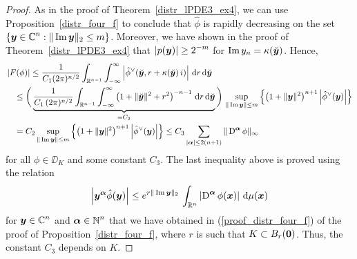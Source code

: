 \begin{proof}
As in the proof of Theorem~\ref{distr_lPDE3_ex4}, we can use
Proposition~\ref{distr_four_f} to conclude that $\hat{\phi}$ is
rapidly decreasing on the set
$\displaystyle \{{\bm{y}} \in \mathbb{C}^n : \|\operatorname{Im} {\bm{y}}\|_2 \leq m \}$.
Moreover, we have shown in the proof of Theorem~\ref{distr_lPDE3_ex4} that
$\displaystyle \left|p({\bm{y}})\right| \geq 2^{-m}$ for
$\operatorname{Im} y_n = \kappa(\breve{{\bm{y}}})$.  Hence, 
\begin{align*}
&\left| F(\phi) \right|
\leq \frac{1}{C_1(2\pi)^{n/2}}
\int_{\mathbb{R}^{n-1}} \int_{-\infty}^\infty
\left| \hat{\phi}^\vee(\breve{{\bm{y}}},r + \kappa(\breve{{\bm{y}}})\,i) \right|
\,\mathrm{d}{r}\,\mathrm{d}{\breve{{\bm{y}}}} \\
&\quad\leq \bigg( \underbrace{ \frac{1}{C_1\,(2\pi)^{n/2}}
\int_{\mathbb{R}^{n-1}} \int_{-\infty}^\infty
\left( 1+\|\breve{{\bm{y}}}\|^2 + r^2\right)^{-n-1} \,\mathrm{d}{r}
  \,\mathrm{d}{\breve{{\bm{y}}}}}_{=C_2} \bigg)
\, \sup_{\|\operatorname{Im} {\bm{y}}\| \leq m } \left\{
\left( 1+ \|{\bm{y}}\|^2  \right)^{n+1}
\left| \hat{\phi}^\vee({\bm{y}}) \right| \right\} \\
&\quad = C_2 \sup_{\|\operatorname{Im} {\bm{y}}\| \leq m} \left\{
\left( 1+\|{\bm{y}}\|^2 \right)^{n+1}
\left| \hat{\phi}^\vee({\bm{y}}) \right| \right\}
\leq C_3 \sum_{|{\bm{\alpha}}|\leq 2(n+1)} \|\operatorname{D}^{{\bm{\alpha}}} \phi\|_\infty
\end{align*}
for all $\phi \in \DD_K$ and some constant $C_3$.
The last inequality above is proved using the relation
\[
\left| {\bm{y}}^{{\bm{\alpha}}} \hat{\phi}({\bm{y}}) \right|
\leq e^{r\|\operatorname{Im} {\bm{y}}\|_2}\,\int_{\mathbb{R}^n}
\left|\operatorname{D}^{{\bm{\alpha}}} \phi({\bm{x}})\right| \,\mathrm{d}{\mu({\bm{x}})}
\]
for $\displaystyle {\bm{y}} \in \mathbb{C}^n$ and
$\displaystyle {\bm{\alpha}} \in \mathbb{N}^n$ that we have obtained in
(\ref{proof_distr_four_f}) of the proof of Proposition~\ref{distr_four_f},
where $r$ is such that $K \subset B_r({\bm{0}})$.
Thus, the constant $C_3$ depends on $K$.


\end{proof}
